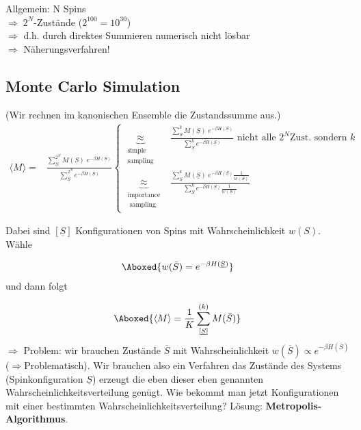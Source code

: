 \documentclass[12pt]{article}
\begin{document}
Allgemein: N Spins \\
$\Rightarrow \; 2^N$-Zustände ($2^{100} = 10^{30}$) \\
$\Rightarrow$ d.h. durch direktes Summieren numerisch nicht lösbar \\
$\Rightarrow$ Näherungsverfahren!

\subsection{Monte Carlo Simulation}
(Wir rechnen im kanonischen Ensemble die Zustandssumme aus.)
\begin{align}
\langle M \rangle = & \frac{\sum^{2^N}_{\underline{S}} M(\underline{S}) \;  e^{-\beta H(\underline{S} ) }}{\sum^{2^N}_{\underline{S}} e^{-\beta H(\underline{S})}}  
\begin{cases}
 \underbrace{\approx}_{\substack{ \text{simple} \\ \text{sampling}}} 
& \frac{\sum^{k}_{\underline{S}} M(\underline{S}) \; e^{-\beta H(\underline{S})}}{\sum^{k}_{\underline{S}} e^{-\beta H(\underline{S})}} \mbox{ nicht alle } 2^N \mbox{Zust. sondern } k \\
\underbrace{\approx}_{\substack{ \text{importance} \\ \text{ sampling}}} & 
\frac{\sum^{k}_{\underline{S}} M(\underline{S}) \; e^{-\beta H(\underline{S})} \frac{1}{w(\underline{S})}}{\sum^{k}_{\underline{S}} e^{-\beta H(\underline{S})} \frac{1}{w(\underline{S})}}
\end{cases}
\end{align}

Dabei sind $[\underline{S}]$ Konfigurationen von Spins mit Wahrscheinlichkeit $w(S)$. Wähle 

\begin{align}
\Aboxed{ w(\bar{S})= e^{-\beta H(\underline{S})}  }
\end{align}
 und dann folgt

\begin{align}
\Aboxed{ \langle M \rangle = \frac{1}{K} \sum_{ [\underline{S}]}^{(k)} M(\bar{S})}
\end{align}
$\Rightarrow$ Problem: wir brauchen Zustände $\overline{S}$ mit Wahrscheinlichkeit $w(\overline{S})\propto e^{-\beta H(\overline{S})}$ ($\Rightarrow$Problematisch). Wir brauchen also ein Verfahren das Zustände des Systems (Spinkonfiguration $\underline{S}$) erzeugt die eben dieser eben genannten Wahrscheinlichkeitsverteilung genügt. Wie bekommt man jetzt Konfigurationen mit einer bestimmten Wahrscheinlichkeitsverteilung? 
Lösung: \textbf{ Metropolis-Algorithmus}. \\
\end{document}
